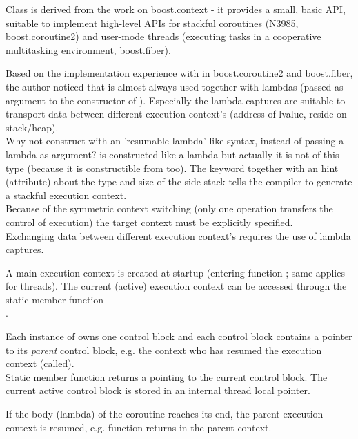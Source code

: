 Class \ectx is derived from the work on boost.context\cite{bcontext} - it
provides a small, basic API, suitable to implement high-level APIs for stackful
coroutines (N3985\cite{N3985}, boost.coroutine2\cite{bcoroutine2}) and user-mode
threads (executing tasks in a cooperative multitasking environment,
boost.fiber\cite{bfiber}).

Based on the implementation experience with  in
boost.coroutine2\cite{bcoroutine2} and boost.fiber\cite{bfiber}, the author
noticed that  is almost always used together with lambdas
(passed as argument to the constructor of ). Especially
the lambda captures are suitable to transport data between different execution
context's (address of lvalue, reside on stack/heap).\\
Why not construct \ectx with an 'resumable lambda'-like syntax, instead of
passing a lambda as argument? \ectx is constructed like a lambda but actually it
is not of this type (because it is constructible from \ectxcurrent too).
The keyword \resumable together with an hint (attribute) about the type and size
of the side stack tells the compiler to generate a stackful execution context.\\
Because of the symmetric context switching (only one operation transfers the
control of execution) the target context must be explicitly specified.\\
Exchanging data between different execution context's requires the use of lambda
captures.

A main execution context is created at startup (entering function \main; same
applies for threads). The current (active) execution context can be accessed
through the static member function\\
\ectxcurrent.

Each instance of \ectx owns one control block and each control block contains a
pointer to its \emph{parent} control block, e.g. the context who has resumed the
execution context (\ectxop called).\\
Static member function \ectxcurrent returns a \ectx pointing to the current
control block. The current active control block is stored in an internal thread
local pointer.

If the body (lambda) of the coroutine reaches its end, the parent execution
context is resumed, e.g. function \ectxop returns in the parent context.

